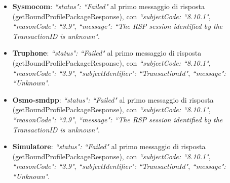 \documentclass[10pt, oneside]{book}
\begin{document}
\begin{itemize}
\item \textbf{Sysmocom}: \textit{``status": ``Failed"} al primo messaggio di risposta (getBoundProfilePackageResponse), con \textit{``subjectCode: ``8.10.1"}, \textit{``reasonCode": ``3.9"}, \textit{``message": ``The RSP session identified by the TransactionID is unknown"}.
\item \textbf{Truphone}: \textit{``status": ``Failed"} al primo messaggio di risposta (getBoundProfilePackageResponse), con \textit{``subjectCode: ``8.10.1"}, \textit{``reasonCode": ``3.9"}, \textit{``subjectIdentifier": ``TransactionId"}, \textit{``message": ``Unknown"}.
\item \textbf{Osmo-smdpp}: \textit{``status": ``Failed"} al primo messaggio di risposta (getBoundProfilePackageResponse), con \textit{``subjectCode: ``8.10.1"}, \textit{``reasonCode": ``3.9"}, \textit{``message": ``The RSP session identified by the TransactionID is unknown"}.
\item \textbf{Simulatore}: \textit{``status": ``Failed"} al primo messaggio di risposta (getBoundProfilePackageResponse), con \textit{``subjectCode: ``8.10.1"}, \textit{``reasonCode": ``3.9"}, \textit{``subjectIdentifier": ``TransactionId"}, \textit{``message": ``Unknown"}.
\end{itemize}
\end{document}
